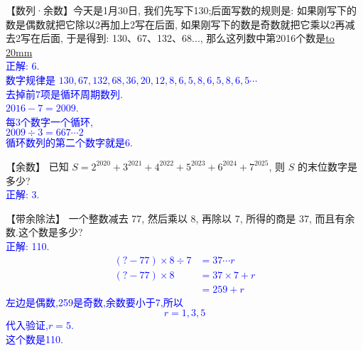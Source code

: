 \item {
    【数列·余数】今天是1月30日, 我们先写下130;后面写数的规则是: 如果刚写下的数是偶数就把它除以2再加上2写在后面, 如果刚写下的数是奇数就把它乘以2再减去2写在后面, 于是得到: 130、67、132、68..., 那么这列数中第2016个数是\underline{\hbox to 20mm{}}
    \ifshowSolution
        \\\fangsong{}\textcolor{blue}{
            正解: 6.\\
            数字规律是 $130,67,132,68,36,20,12,8,6,5,8,6,5,8,6,5\cdots$\\
            去掉前7项是循环周期数列.\\
            $2016-7=2009$.\\
            每3个数字一个循环,\\
            $ 2009\div 3 = 667\cdots 2$\\
            循环数列的第二个数字就是6.
        }
    \else
        \vspace{1cm}
    \fi
}

\item {
    【余数】
    已知 $S = 2^{2020} + 3^{2021} + 4^{2022} + 5^{2023} +6^{2024} + 7^{2025}$, 则 $S$ 的末位数字是多少? 
    \ifshowSolution
        \\\fangsong{}\textcolor{blue}{
            正解: 3.
        }
    \else
        \vspace{1cm}
    \fi
}

\item {
    【带余除法】
    一个整数减去 77, 然后乘以 8, 再除以 7, 所得的商是 37, 而且有余数.这个数是多少? 
    \ifshowSolution
        \\\fangsong{}\textcolor{blue}{
            正解: 110.
            \begin{align*}
                (?-77)\times 8\div 7 &= 37\cdots r\\
                (?-77)\times 8 &= 37\times 7 + r\\
                &= 259 + r
            \end{align*}
            左边是偶数,259是奇数,余数要小于7,所以 
            \[ r = 1,3,5\]
            代入验证,$r=5$.\\
            这个数是110.
        }
    \else
        \vspace{1cm}
    \fi
}

